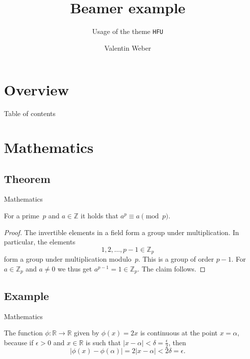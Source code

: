 \documentclass[english,aspectratio=169]{beamer}
\author{Valentin Weber}
\title{Beamer example}
\subtitle{Usage of the theme \texttt{HFU}}
\begin{document}
\section{Overview}
%
%
\begin{frame}{Table of contents}
    \tableofcontents[currentsection]
\end{frame}


\section{Mathematics}
\subsection{Theorem}


\begin{frame}{Mathematics}
    \begin{theorem}
        For a prime~\(p\) and \(a \in \mathbb{Z}\) it holds that \(a^p \equiv a \pmod{p}\).
    \end{theorem}

    \begin{proof}
        The invertible elements in a field form a group under multiplication.
        In particular, the elements
        \begin{equation*}
            1, 2, \ldots, p - 1 \in \mathbb{Z}_p
        \end{equation*}
        form a group under multiplication modulo~\(p\).
        This is a group of order \(p - 1\).
        For \(a \in \mathbb{Z}_p\) and \(a \neq 0\) we thus get \(a^{p-1} = 1 \in \mathbb{Z}_p\).
        The claim follows.
    \end{proof}
\end{frame}


\subsection{Example}


\begin{frame}{Mathematics}
    \begin{example}
        The function \(\phi \colon \mathbb{R} \to \mathbb{R}\) given by \(\phi(x) = 2x\) is continuous at the point \(x = \alpha\),
        because if \(\epsilon > 0\) and \(x \in \mathbb{R}\) is such that \(\lvert x - \alpha \rvert < \delta = \frac{\epsilon}{2}\),
        then
        \begin{equation*}
            \lvert \phi(x) - \phi(\alpha)\rvert = 2\lvert x - \alpha \rvert < 2\delta = \epsilon.
        \end{equation*}
    \end{example}
\end{frame}
\end{document}
